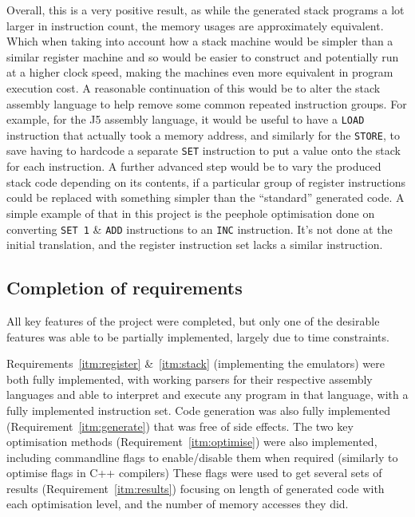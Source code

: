 Overall, this is a very positive result, as while the generated stack programs a
lot larger in instruction count, the memory usages are approximately equivalent.
Which when taking into account how a stack machine would be simpler than a
similar register machine and so would be easier to construct and potentially run
at a higher clock speed, making the machines even more equivalent in program
execution cost. A reasonable continuation of this would be to alter the stack
assembly language to help remove some common repeated instruction groups. For
example, for the J5 assembly language, it would be useful to have a
\texttt{LOAD} instruction that actually took a memory address, and similarly for
the \texttt{STORE}, to save having to hardcode a separate \texttt{SET}
instruction to put a value onto the stack for each instruction. A further
advanced step would be to vary the produced stack code depending on its
contents, if a particular group of register instructions could be replaced with
something simpler than the ``standard'' generated code. A simple example of that
in this project is the peephole optimisation done on converting \texttt{SET 1}
\& \texttt{ADD} instructions to an \texttt{INC} instruction. It's not done at
the initial translation, and the register instruction set lacks a similar
instruction.

\subsection{Completion of requirements}
All key features of the project were completed, but only one of the desirable
features was able to be partially implemented, largely due to time constraints.

Requirements~\ref{itm:register} \&~\ref{itm:stack} (implementing the emulators)
were both fully implemented, with working parsers for their respective assembly
languages and able to interpret and execute any program in that language, with a
fully implemented instruction set.
Code generation was also fully implemented (Requirement~\ref{itm:generate}) that
was free of side effects.
The two key optimisation methods (Requirement~\ref{itm:optimise}) were
also implemented, including commandline flags to enable/disable them when
required (similarly to optimise flags in C++ compilers)
These flags were used to get several sets of results
(Requirement~\ref{itm:results}) focusing on length of generated code with each
optimisation level, and the number of memory accesses they did.

